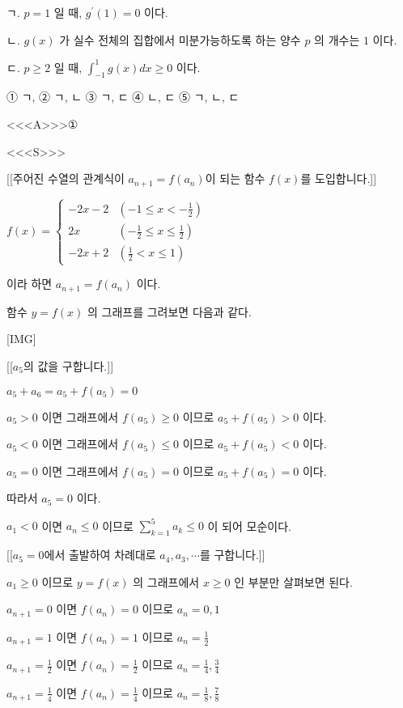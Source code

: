 \documentclass{oblivoir}
\begin{document}
ㄱ. $p=1$ 일 때, $g^{\prime}(1)=0$ 이다.

ㄴ. $g(x)$ 가 실수 전체의 집합에서 미분가능하도록 하는 양수 $p$ 의 개수는 $1$ 이다.

ㄷ. $p \geq 2$ 일 때, $\int_{-1}^{1} g(x) d x \geq 0$ 이다.

① ㄱ,
② ㄱ, ㄴ
③ ㄱ, ㄷ
④ ㄴ, ㄷ
⑤ ㄱ, ㄴ, ㄷ


<<<A>>>①

<<<S>>>

[[주어진 수열의 관계식이 $a_{n+1}=f\left(a_{n}\right)$이 되는 함수 $f(x)$를 도입합니다.]]

$f(x)=\left\{\begin{array}{cl}-2 x-2 & \left(-1 \leq x<-\frac{1}{2}\right) \\ 2 x & \left(-\frac{1}{2} \leq x \leq \frac{1}{2}\right) \\ -2 x+2 & \left(\frac{1}{2}<x \leq 1\right)\end{array}\right.$

이라 하면 $a_{n+1}=f\left(a_{n}\right)$ 이다.

함수 $y=f(x)$ 의 그래프를 그려보면 다음과 같다.

[IMG]

[[$a_{5}$의 값을 구합니다.]]

$a_{5}+a_{6}=a_{5}+f\left(a_{5}\right)=0$

$a_{5}>0 $ 이면 그래프에서 $ f\left(a_{5}\right) \geq 0 $ 이므로 $a_{5}+f\left(a_{5}\right)>0 $ 이다.

$a_{5}<0 $ 이면 그래프에서 $f\left(a_{5}\right) \leq 0 $ 이므로 $a_{5}+f\left(a_{5}\right)<0 $ 이다.

$a_{5}=0 $ 이면 그래프에서 $f\left(a_{5}\right)=0 $ 이므로 $a_{5}+f\left(a_{5}\right)=0 $ 이다.

따라서 $a_{5}=0$ 이다.

$a_{1}<0$ 이면 $a_{n} \leq 0$ 이므로 $\sum_{k=1}^{5} a_{k} \leq 0$ 이 되어 모순이다.

[[$a_{5}=0$에서 출발하여 차례대로 $a_{4},a_{3},\cdots$를 구합니다.]]

$a_{1} \geq 0$ 이므로 $y=f(x)$ 의 그래프에서 $x \geq 0$ 인 부분만 살펴보면 된다.

$a_{n+1}=0$ 이면 $f\left(a_{n}\right)=0$ 이므로 $a_{n}=0,1$

$a_{n+1}=1$ 이면 $f\left(a_{n}\right)=1$ 이므로 $a_{n}=\frac{1}{2}$

$a_{n+1}=\frac{1}{2}$ 이면 $f\left(a_{n}\right)=\frac{1}{2}$ 이므로 $a_{n}=\frac{1}{4}, \frac{3}{4}$

$a_{n+1}=\frac{1}{4}$ 이면 $f\left(a_{n}\right)=\frac{1}{4} $ 이므로 $a_{n}=\frac{1}{8}, \frac{7}{8}$
\end{document}
